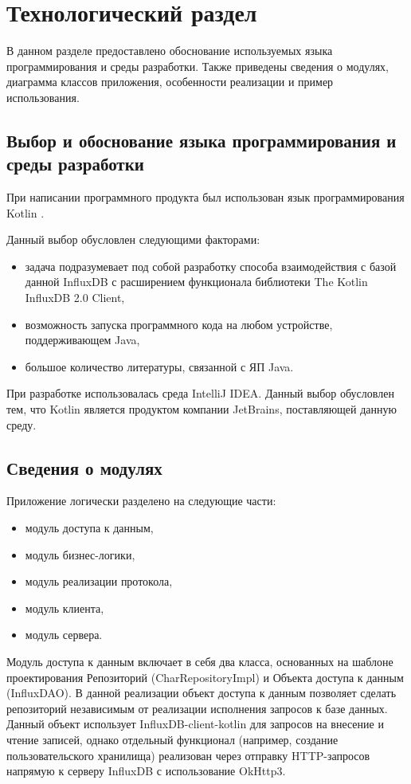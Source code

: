 \section{Технологический раздел}
В данном разделе предоставлено обоснование используемых языка программирования и среды разработки. Также приведены сведения о модулях, диаграмма классов приложения, особенности реализации и пример использования.

\subsection{Выбор и обоснование языка программирования и среды разработки}
При написании программного продукта был использован язык программирования Kotlin \cite{Kotlin}. 

Данный выбор обусловлен следующими факторами:
\begin{itemize}
\item задача подразумевает под собой разработку способа взаимодействия с базой данной InfluxDB с расширением функционала библиотеки The Kotlin InfluxDB 2.0 Client,
\item возможность запуска программного кода на любом устройстве, поддерживающем Java,
\item большое количество литературы, связанной с ЯП Java.
\end{itemize}

При разработке использовалась среда IntelliJ IDEA. Данный выбор обусловлен тем, что Kotlin является продуктом компании JetBrains, поставляющей данную среду.

\subsection{Сведения о модулях}
Приложение логически разделено на следующие части:
\begin{itemize}
\item модуль доступа к данным,
\item модуль бизнес-логики,
\item модуль реализации протокола,
\item модуль клиента,
\item модуль сервера.
\end{itemize}

Модуль доступа к данным включает в себя два класса, основанных на шаблоне проектирования Репозиторий (CharRepositoryImpl) и Объекта доступа к данным (InfluxDAO). В данной реализации объект доступа к данным позволяет сделать репозиторий независимым от реализации исполнения запросов к базе данных. Данный объект использует InfluxDB-client-kotlin для запросов на внесение и чтение записей, однако отдельный функционал (например, создание пользовательского хранилища) реализован через отправку HTTP-запросов напрямую к серверу InfluxDB с использование OkHttp3.


